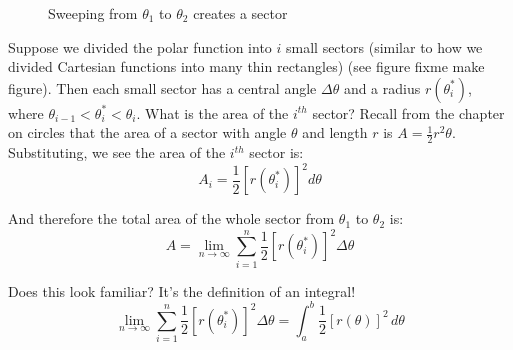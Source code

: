 \begin{figure}[htbp]
\centering
    \caption{Sweeping from $\theta_1$ to $\theta_2$ creates a sector}
    \label{fig:sector}
\end{figure}

Suppose we divided the polar function into $i$ small sectors (similar to how 
we divided Cartesian functions into many thin rectangles) (see figure fixme 
make figure). Then each small sector has a central angle $\Delta \theta$ and 
a radius $r(\theta_i^*)$, where $\theta_{i-1} < \theta_i^* < \theta_i$. What 
is the area of the $i^{th}$ sector? Recall from the chapter on circles that 
the area of a sector with angle $\theta$ and length $r$ is $A = \frac{1}{2} 
r^2 \theta$. Substituting, we see the area of the $i^{th}$ sector is:
$$A_i = \frac{1}{2} \left[ r(\theta_i^*) \right]^2 d\theta$$

And therefore the total area of the whole sector from $\theta_1$ to $\theta_2$ 
is:
$$A = \lim_{n \to \infty} \sum_{i = 1}^n \frac{1}{2} \left[ r( \theta_i^*) 
\right] ^2 \Delta \theta$$

Does this look familiar? It's the definition of an integral!
$$\lim_{n \to \infty} \sum_{i = 1}^n \frac{1}{2} \left[ r( \theta_i^*) \right] 
^2 \Delta \theta = \int_a^b \frac{1}{2} \left[ r(\theta) \right]^2\,d\theta$$

